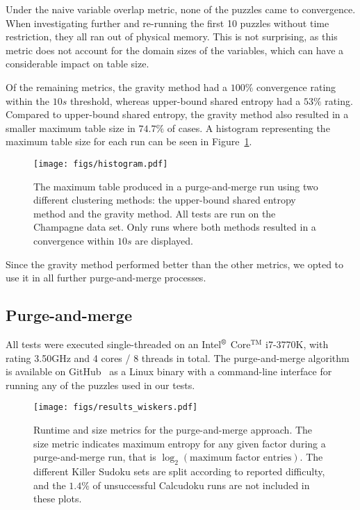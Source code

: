 \documentclass{ieeeaccess}
\begin{document}
{	Under the naive variable overlap metric, none of the puzzles came to convergence. When investigating further and re-running the first 10 puzzles without time restriction, they all ran out of physical memory. This is not surprising, as this metric does not account for the domain sizes of the variables, which can have a considerable impact on table size.
	
	Of the remaining metrics, the gravity method had a $100\%$ convergence rating within the $10s$ threshold, whereas upper-bound shared entropy had a $53\%$ rating. Compared to upper-bound shared entropy, the gravity method also resulted in a smaller maximum table size in $74.7\%$ of cases. A histogram representing the maximum table size for each run can be seen in Figure~\ref{fig-histogram}.
	
	\begin{figure}[h!]
		\centering
		\texttt{[image: figs/histogram.pdf]}
		\caption{The maximum table produced in a purge-and-merge run using two different clustering methods: the upper-bound shared entropy method and the gravity method. All tests are run on the Champagne data set. Only runs where both methods resulted in a convergence within $10s$ are displayed.}\label{fig-histogram}
	\end{figure}
	
	Since the gravity method performed better than the other metrics, we opted to use it in all further purge-and-merge processes.
	
	\subsection{Purge-and-merge}
	All tests were executed single-threaded on an Intel$^\text{\textregistered}$  Core$^\text{TM}$ i7-3770K, with rating 3.50GHz and 4 cores / 8 threads in total. The purge-and-merge algorithm is available on GitHub~\cite{streichergithub} as a Linux binary with a command-line interface for running any of the puzzles used in our tests.
	
	
	\begin{figure}[h!]
		\centering
		\texttt{[image: figs/results\_wiskers.pdf]}
		\caption{Runtime and size metrics for the purge-and-merge approach. The size metric indicates maximum entropy for any given factor during a purge-and-merge run, that is $\log_2(\text{maximum factor entries})$. The different Killer Sudoku sets are split according to reported difficulty, and the $1.4\%$ of unsuccessful Calcudoku runs are not included in these plots.
		}\label{fig-plotresults}
	\end{figure}
	
}
\end{document}
